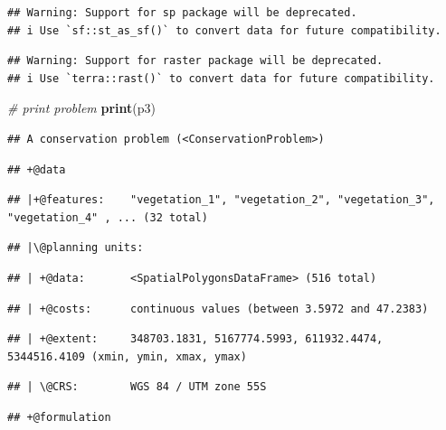 \documentclass[12pt,]{book}
\newenvironment{Shaded}{\begin{snugshade}}{\end{snugshade}}
\newcommand{\CommentTok}[1]{\textcolor[rgb]{0.56,0.35,0.01}{\textit{#1}}}
\newcommand{\KeywordTok}[1]{\textcolor[rgb]{0.13,0.29,0.53}{\textbf{#1}}}
\newcommand{\NormalTok}[1]{#1}
\begin{document}
\begin{verbatim}
## Warning: Support for sp package will be deprecated.
## i Use `sf::st_as_sf()` to convert data for future compatibility.
\end{verbatim}

\begin{verbatim}
## Warning: Support for raster package will be deprecated.
## i Use `terra::rast()` to convert data for future compatibility.
\end{verbatim}

\begin{Shaded}
\begin{Highlighting}[]
\CommentTok{# print problem}
\KeywordTok{print}\NormalTok{(p3)}
\end{Highlighting}
\end{Shaded}

\begin{verbatim}
## A conservation problem (<ConservationProblem>)
\end{verbatim}

\begin{verbatim}
## +@data
\end{verbatim}

\begin{verbatim}
## |+@features:    "vegetation_1", "vegetation_2", "vegetation_3", "vegetation_4" , ... (32 total)
\end{verbatim}

\begin{verbatim}
## |\@planning units:
\end{verbatim}

\begin{verbatim}
## | +@data:       <SpatialPolygonsDataFrame> (516 total)
\end{verbatim}

\begin{verbatim}
## | +@costs:      continuous values (between 3.5972 and 47.2383)
\end{verbatim}

\begin{verbatim}
## | +@extent:     348703.1831, 5167774.5993, 611932.4474, 5344516.4109 (xmin, ymin, xmax, ymax)
\end{verbatim}

\begin{verbatim}
## | \@CRS:        WGS 84 / UTM zone 55S
\end{verbatim}

\begin{verbatim}
## +@formulation
\end{verbatim}
\end{document}
